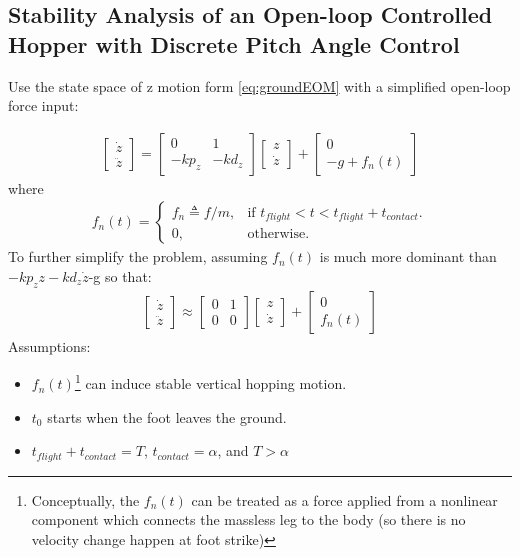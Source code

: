 \subsection{Stability Analysis of an Open-loop Controlled Hopper with Discrete Pitch Angle Control}
Use the state space of z motion form \ref{eq:groundEOM} with a simplified open-loop force input:

\begin{align}
\begin{bmatrix}
\dot z  \\
\ddot z 
\end{bmatrix} = \begin{bmatrix}
0 & 1 \\
-kp_z & -kd_z
\end{bmatrix}\begin{bmatrix}
 z  \\
\dot z 
\end{bmatrix} + 
\begin{bmatrix}
0  \\
-g+f_n(t)
\end{bmatrix}
\end{align}
where 
\begin{align}
 f_n(t)=\begin{cases}
    f_n\triangleq f/m, & \text{if $t_{flight}<t<t_{flight}+t_{contact}$}.\\
    0, & \text{otherwise}.
  \end{cases}
\end{align}
To further simplify the problem, assuming $f_n(t)$ is much more dominant than $-kp_zz-kd_z\dot z$-g so that:
\begin{align}
\label{eq:SimpleHopper}
\begin{bmatrix}
\dot z  \\
\ddot z 
\end{bmatrix} \approx \begin{bmatrix}
0 & 1 \\
0 & 0
\end{bmatrix}\begin{bmatrix}
 z  \\
\dot z 
\end{bmatrix} + 
\begin{bmatrix}
0  \\
f_n(t)
\end{bmatrix}
\end{align}
Assumptions:
\begin{itemize}
\item $f_n(t)$\footnote{Conceptually, the $f_n(t)$ can be treated as a force applied from a nonlinear component which connects the massless leg to the body (so there is no velocity change happen at foot strike)} can induce stable vertical hopping motion.
\item $t_0$ starts when the foot leaves the ground.
\item $t_{flight} + t_{contact} = T$, $t_{contact} = \alpha$, and $T>\alpha$
\end{itemize}
